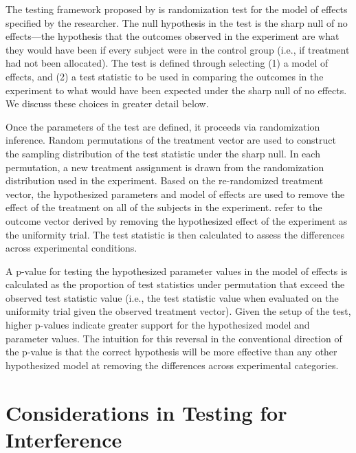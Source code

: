 \documentclass[12pt]{article}
\begin{document}
The testing framework proposed by \citet{bowers2012reasoning} is  randomization test \citep{basu2011randomization} for the model of effects specified by the researcher. The null hypothesis in the test is the sharp null of no effects---the hypothesis that the outcomes observed in the experiment are what they would have been if every subject were in the control group (i.e., if treatment had not been allocated). The test is defined through selecting (1) a model of effects, and (2) a test statistic to be used in comparing the outcomes in the experiment to what would have been expected under the sharp null of no effects. We discuss these choices in greater detail below.   

Once the parameters of the test are defined, it proceeds via randomization inference. Random permutations of the treatment vector are used to construct the sampling distribution of the test statistic under the sharp null.  In each permutation, a new treatment assignment is drawn from the randomization distribution used in the experiment. Based on the re-randomized treatment vector, the hypothesized parameters and model of effects are used to remove the effect of the treatment on all of the subjects in the experiment. \citet{bowers2012reasoning} refer to the outcome vector derived by removing the hypothesized effect of the experiment as the uniformity trial. The test statistic is then calculated to assess the differences across experimental conditions.

A p-value for testing the hypothesized parameter values in the model of effects is calculated as the proportion of test statistics under permutation that exceed the observed test statistic value (i.e., the test statistic value when evaluated on the uniformity trial given the observed treatment vector). Given the setup of the test, higher p-values indicate greater support for the hypothesized model and parameter values. The intuition for this reversal in the conventional direction of the p-value is that the correct hypothesis will be more effective than any other hypothesized model at removing the differences across experimental categories.

\section{Considerations in Testing for Interference}
\end{document}
